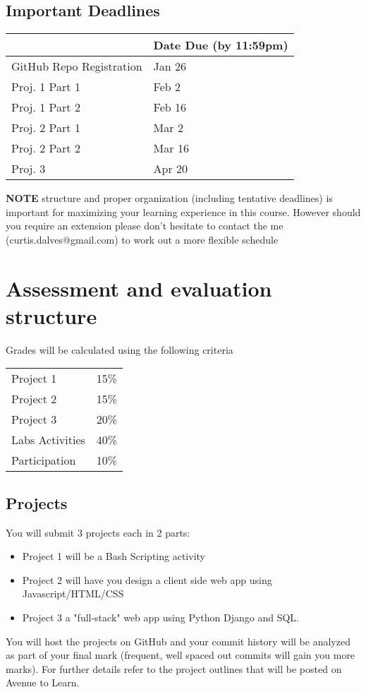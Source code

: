 \documentclass{article}
\begin{document}
\subsection{Important Deadlines}
\label{sec:org641cb77}
\begin{center}
\begin{tabular}{ll}
 & Date Due (by 11:59pm)\\
\hline
GitHub Repo Registration & Jan 26\\
Proj. 1 Part 1 & Feb 2\\
Proj. 1 Part 2 & Feb 16\\
Proj. 2 Part 1 & Mar 2\\
Proj. 2 Part 2 & Mar 16\\
Proj. 3 & Apr 20\\
\end{tabular}
\end{center}

\noindent
\textbf{NOTE} structure and proper organization (including tentative deadlines) is
 important for maximizing your learning experience in this course. However
 should you require an extension please don't hesitate to contact the
 me (curtis.dalves@gmail.com) to work out a more flexible schedule

\section{Assessment and evaluation structure}
\label{sec:org937fffb}
Grades will be calculated using the following criteria
\begin{center}
\begin{tabular}{ll}
Project 1 & 15\%\\
Project 2 & 15\%\\
Project 3 & 20\%\\
Labs Activities & 40\%\\
Participation & 10\%\\
\end{tabular}
\end{center}

\subsection{Projects}
\label{sec:orgf44f472}
You will submit 3 projects each in 2 parts:
\begin{itemize}
\item Project 1 will be a Bash Scripting activity
\item Project 2 will have you design a client side web app using
Javascript/HTML/CSS
\item Project 3 a "full-stack" web app using Python Django and SQL.
\end{itemize}
You will host the projects on GitHub and your commit history will be analyzed
as part of your final mark (frequent, well spaced out commits will gain you
more marks). For further details refer to the project outlines that will be
posted on Avenue to Learn.
\end{document}

